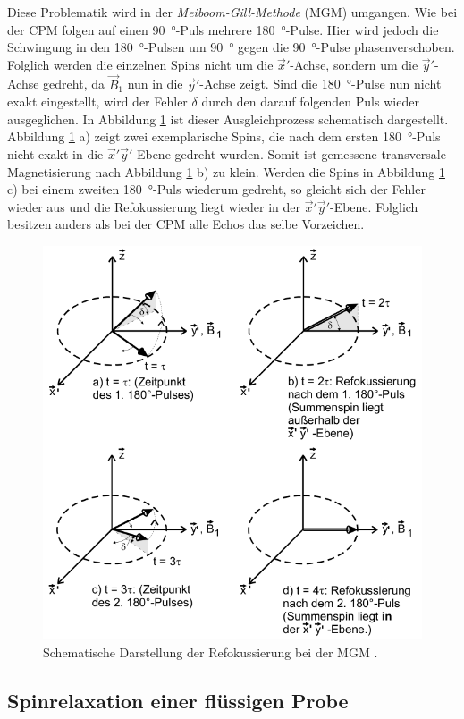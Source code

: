 Diese Problematik wird in der \emph{Meiboom-Gill-Methode} (MGM)
umgangen.
Wie bei der CPM folgen auf einen \SI{90}{\degree}-Puls mehrere \SI{180}{\degree}-Pulse.
Hier wird jedoch die Schwingung in den \SI{180}{\degree}-Pulsen
um \SI{90}{\degree} gegen die \SI{90}{\degree}-Pulse phasenverschoben.
Folglich werden die einzelnen Spins nicht um die $\vec{x}'$-Achse,
sondern um die $\vec{y}'$-Achse gedreht, da $\vec{B}_1$ nun in die $\vec{y}'$-Achse zeigt.
Sind die \SI{180}{\degree}-Pulse nun nicht exakt eingestellt,
wird der Fehler $\delta$ durch den darauf folgenden Puls wieder ausgeglichen.
In Abbildung \ref{fig:Meiboom-Gill-Methode} ist dieser Ausgleichprozess schematisch
dargestellt.
Abbildung \ref{fig:Meiboom-Gill-Methode} a) zeigt zwei exemplarische Spins,
die nach dem ersten \SI{180}{\degree}-Puls
nicht exakt in die $\vec{x}' \vec{y}'$-Ebene gedreht wurden.
Somit ist gemessene transversale Magnetisierung
nach Abbildung \ref{fig:Meiboom-Gill-Methode} b) zu klein.
Werden die Spins in Abbildung \ref{fig:Meiboom-Gill-Methode} c) bei einem zweiten
\SI{180}{\degree}-Puls wiederum gedreht, so gleicht sich der Fehler
wieder aus und die Refokussierung liegt wieder in der $\vec{x}' \vec{y}'$-Ebene.
Folglich besitzen anders als bei der CPM alle Echos das selbe Vorzeichen.
\begin{figure}
  \centering
  \includegraphics[width=.7\textwidth]{images/meilboom-gill.pdf}
  \caption{Schematische Darstellung der Refokussierung bei der MGM \cite[12]{anleitung}.}
  \label{fig:Meiboom-Gill-Methode}
\end{figure}


\subsection{Spinrelaxation einer flüssigen Probe}
\label{sec:DiffusionTheo}

